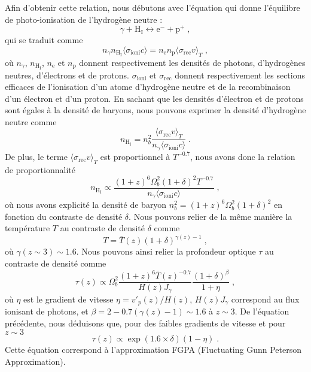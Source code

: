 Afin d'obtenir cette relation, nous débutons avec l'équation qui donne l'équilibre de photo-ionisation de l'hydrogène neutre :
\begin{equation}
  \gamma + \mathrm{H}_{\mathrm{I}} \leftrightarrow \mathrm{e}^{-} + \mathrm{p}^{+} \; ,
\end{equation}
qui se traduit comme
\begin{equation}
  n_{\gamma} n_{\mathrm{H}_{\mathrm{I}}} \langle \sigma_{\mathrm{ioni}} c \rangle
  = n_{\mathrm{e}} n_{\mathrm{p}} \langle \sigma_{\mathrm{rec}} v \rangle_{T} \; ,
\end{equation}
où $n_{\gamma}$, $n_{\mathrm{H}_{\mathrm{I}}}$, $n_{\mathrm{e}}$ et $n_{\mathrm{p}}$ donnent respectivement les densités de photons, d'hydrogènes neutres, d'électrons et de protons.
$ \sigma_{\mathrm{ioni}}$ et $\sigma_{\mathrm{rec}}$ donnent respectivement les sections efficaces de l'ionisation d'un atome d'hydrogène neutre et de la recombinaison d'un électron et d'un proton.
En sachant que les densités d'électron et de protons sont égales à la densité de baryons, nous pouvons exprimer la densité d'hydrogène neutre comme
\begin{equation}
  n_{\mathrm{H}_{\mathrm{I}}}
  = n_{b}^2 \frac{\langle \sigma_{\mathrm{rec}} v \rangle_{T}}{n_{\gamma} \langle \sigma_{\mathrm{ioni}} c \rangle } \; .
\end{equation}
De plus, le terme $\langle \sigma_{\mathrm{rec}} v \rangle_{T}$ est proportionnel à $T^{-\num{0.7}}$, nous avons donc la relation de proportionnalité
\begin{equation}
  n_{\mathrm{H}_{\mathrm{I}}} \propto \frac{(1+z)^6 \Omega_b^2 (1+\delta)^2 T^{-\num{0.7}}}{n_{\gamma} \langle \sigma_{\mathrm{ioni}} c \rangle} \; ,
\end{equation}
où nous avons explicité la densité de baryon $n_{b}^2 = (1+z)^6 \Omega_b^2 (1+\delta)^2$ en fonction du contraste de densité $\delta$.
Nous pouvons relier de la même manière la température $T$ au contraste de densité $\delta$ comme
\begin{equation}
  T = \overline T(z)(1+\delta)^{\gamma(z) -1 } \; ,
\end{equation}
où $\gamma (z \sim 3) \sim \num{1.6}$.
Nous pouvons ainsi relier la profondeur optique $\tau$ au contraste de densité comme
\begin{equation}
  \label{eq:tau_vs_delta}
  \tau(z) \propto  \Omega_b^2 \frac{(1+z)^6 \overline T(z)^{-\num{0.7}}}{H(z)J_{\gamma}}
  \frac{(1+\delta)^{\beta}}{1+\eta} \; ,
\end{equation}
où $\eta$ est le gradient de vitesse $\eta = v'_{p}(z) / H(z)$, $H(z)J_{\gamma}$ correspond au flux ionisant de photons, et $\beta = 2 - \num{0.7}(\gamma(z) -1) \sim \num{1.6}$ à $z \sim 3$.
De l'équation précédente, nous déduisons que, pour des faibles gradients de vitesse et pour $z \sim 3$
\begin{equation}
\tau(z) \propto \exp(\num{1.6} \times \delta) (1 - \eta) \; .
\end{equation}
Cette équation correspond à l'approximation FGPA (Fluctuating Gunn Peterson Approximation).


% 
